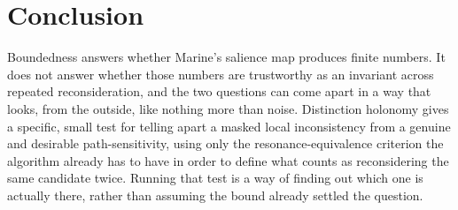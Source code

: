 \documentclass[11pt]{article}
\begin{document}
\section{Conclusion}

Boundedness answers whether Marine's salience map produces finite numbers. It does not answer whether those numbers are trustworthy as an invariant across repeated reconsideration, and the two questions can come apart in a way that looks, from the outside, like nothing more than noise. Distinction holonomy gives a specific, small test for telling apart a masked local inconsistency from a genuine and desirable path-sensitivity, using only the resonance-equivalence criterion the algorithm already has to have in order to define what counts as reconsidering the same candidate twice. Running that test is a way of finding out which one is actually there, rather than assuming the bound already settled the question.
\end{document}
